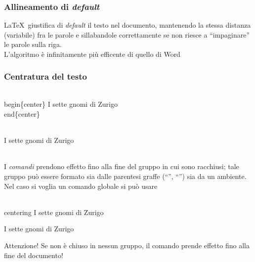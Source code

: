 \documentclass[svgnames,%
	ucs,%
	pdftex]{guitbeamer}
\begin{document}
\begin{frame}
  \frametitle{Allineamento di \textit{default}}
	\LaTeX\ giustifica di \textit{default} il testo nel documento,
	mantenendo la stessa distanza (variabile) fra le parole e
	sillabandole correttamente se non riesce a ``impaginare'' le parole
	sulla riga.\\
  \medskip
	L'algoritmo \`e infinitamente pi\`u efficente di quello di Word
\end{frame}
\begin{frame}
  \frametitle{Centratura del testo}
	\begin{LaTeXcode}
		\alert{\\begin\{center\}}\n
		\hspace*{5ex}I sette gnomi di Zurigo\n
		\alert{\\end\{center\}}
	\end{LaTeXcode}
	\begin{LaTeXoutput}
		\begin{center}
		\ \\
		I sette gnomi di Zurigo\\[-1ex]
		\
		\end{center}
	\end{LaTeXoutput}
\end{frame}
\begin{frame}
	I \emph{comandi} prendono effetto fino alla fine del gruppo
	in cui sono racchiusi; tale gruppo pu\`o essere formato sia dalle
	parentesi graffe (``\tlb'', ``\trb'') sia da un ambiente.\\
  \medskip
  \onslide<2->
	Nel caso si voglia un comando globale si pu\`o usare \LCmd{centering}
	\begin{LaTeXcode}
		\alert{\\centering}\n
		\hspace*{5ex}I sette gnomi di Zurigo
	\end{LaTeXcode}
	\begin{LaTeXoutput}
		\centering
		I sette gnomi di Zurigo
	\end{LaTeXoutput}
	\begin{block}{Attenzione!}
		Se non \`e chiuso in nessun gruppo, il comando prende effetto fino
		alla fine del documento!
	\end{block}
\end{frame}
\end{document}
